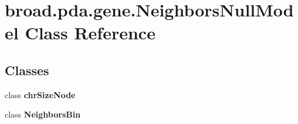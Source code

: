 \hypertarget{classbroad_1_1pda_1_1gene_1_1_neighbors_null_model}{\section{broad.\+pda.\+gene.\+Neighbors\+Null\+Model Class Reference}
\label{classbroad_1_1pda_1_1gene_1_1_neighbors_null_model}
}
\subsection*{Classes}
\begin{DoxyCompactItemize}
\item 
class {\bfseries chr\+Size\+Node}
\item 
class {\bfseries Neighbors\+Bin}
\end{DoxyCompactItemize}
